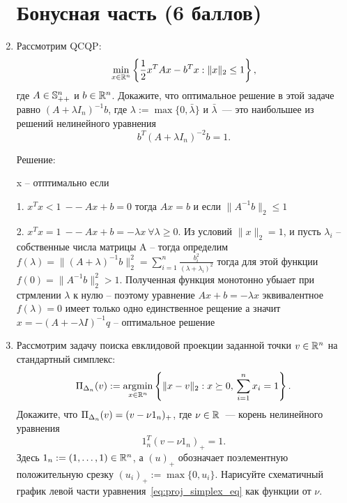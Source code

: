 \documentclass{article}
\begin{document}
\begin{enumerate}[label=\textbf{\arabic*}, leftmargin=0em]
\section*{Бонусная часть (6 баллов)}

\item Рассмотрим QCQP:
\begin{equation}
\min_{x \in \R^n} \left\{ \frac{1}{2} x^T A x - b^T x : \| x \|_2 \leq 1 \right\},
\end{equation}
где $A \in \S^n_{++}$ и $b \in \R^n$. Докажите, что оптимальное решение в этой задаче равно $(A + \lambda I_n)^{-1} b$, где $\lambda := \max\{ 0, \bar{\lambda} \}$ и $\bar{\lambda}$~--- это наибольшее из решений нелинейного уравнения
\begin{equation}
b^T (A + \lambda I_n)^{-2} b = 1.
\end{equation}

Решение:

x -- отптимально если

1. $x^Tx < 1\ --\ Ax + b = 0$ тогда $Ax = b$ и если $\|A^{-1}b\|_2 \leq 1$


2. $x^Tx = 1\ --\  Ax + b = -\lambda x\ \forall \lambda \geq 0$. Из условий $\|x\|_2 = 1$, и пусть $\lambda_i$ -- собственные числа матрицы A -- тогда определим $f(\lambda) = \|(A + \lambda)^{-1}b\|_2^2 = \sum_{i = 1}^{n} \frac{b_i^2}{(\lambda + \lambda_i)^2}$ тогда для этой функции $f(0) = \|A^{-1}b\|_2^2 > 1$. Полученная функция монотонно убыает при стрмлении $\lambda$ к нулю -- поэтому уравнение $Ax + b = -\lambda x$ эквивалентное $f(\lambda) = 0$ имеет только одно единственное рещение а значит $x = -(A + - \lambda I)^{-1}q$ -- оптимальное решение




\item Рассмотрим задачу поиска евклидовой проекции заданной точки $v \in \R^n$ на стандартный симплекс:
\begin{equation}
\Proj_{\Delta_n}(v) := \argmin_{x \in \R^n} \left\{ \| x - v \|_2 : x \succeq 0, \, \sum_{i=1}^n x_i = 1 \right\}.
\end{equation}
Докажите, что $\Proj_{\Delta_n}(v) = (v - \nu 1_n)_+$, где $\nu \in \R$~--- корень нелинейного уравнения
\begin{equation}\label{eq:proj_simplex_eq}
1_n^T (v - \nu 1_n)_+ = 1.
\end{equation}
Здесь $1_n := (1, \dots, 1) \in \R^n$, а $(u)_+$ обозначает поэлементную положительную срезку $(u_i)_+ := \max\{0, u_i\}$.
Нарисуйте схематичный график левой части уравнения~\eqref{eq:proj_simplex_eq} как функции от $\nu$.


\end{enumerate}
\end{document}
